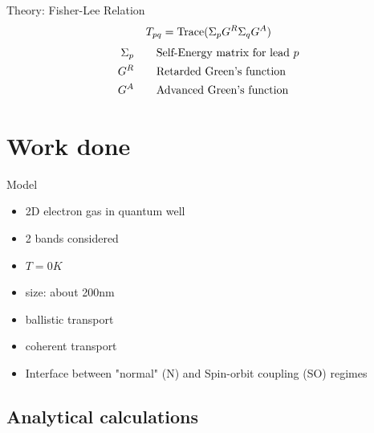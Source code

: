 \documentclass{beamer}
\begin{document}
\begin{frame}{Theory: Fisher-Lee Relation}
    {
        \huge
        \begin{align*}
            T_{pq} = \textnormal{Trace}( \Sigma_p G^R \Sigma_q G^A )
        \end{align*}
    }
    \begin{align*}
        \Sigma_p\qquad &\textnormal{Self-Energy matrix for lead $p$}\\
        G^R     \qquad &\textnormal{Retarded Green's function}\\ 
        G^A     \qquad &\textnormal{Advanced Green's function}\\ 
    \end{align*}
\end{frame}

\section{Work done}
\begin{frame}{Model}
    \begin{itemize}
        \item 2D electron gas in quantum well
        \item 2 bands considered
        \item $T = 0K$
        \item size: about 200nm
        \item ballistic transport
        \item coherent transport
        \item Interface between "normal" (N) and Spin-orbit  coupling (SO) regimes
    \end{itemize}
\end{frame}

\subsection{Analytical calculations}
\end{document}
